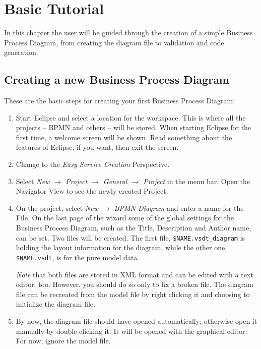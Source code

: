 \chapter{Basic Tutorial}
\label{sec:user_tut}

In this chapter the user will be guided through the creation of a simple Business Process Diagram, from creating the diagram file to validation and code generation.


\section{Creating a new Business Process Diagram}
\label{sec:user_tut_new}

These are the basic steps for creating your first Business Process Diagram:

\begin{enumerate}
	
	\item Start Eclipse and select a location for the workspace. This is where all the projects -- BPMN and others -- will be stored. When starting Eclipse for the first time, a welcome screen will be shown. Read something about the features of Eclipse, if you want, then exit the screen.
	
	\item Change to the \emph{Easy Service Creation} Perspective.
	
	\item Select \emph{ New $\rightarrow$ Project $\rightarrow$ General $\rightarrow$ Project } in the menu bar. Open the Navigator View to see the newly created Project.
	
	\item On the project, select \emph{New $\rightarrow$ BPMN Diagram} and enter a name for the File.  On the last page of the wizard some of the global settings for the Business Process Diagram, such as the Title, Description and Author name, can be set.  Two files will be created.  The first file, \verb|$NAME.vsdt_diagram| is holding the layout information for the diagram, while the other one, \verb|$NAME.vsdt|, is for the pure model data.
	
	\emph{Note} that both files are stored in XML format and can be edited with a text editor, too. However, you should do so only to fix a broken file. The diagram file can be recreated from the model file by right clicking it and choosing to initialize the diagram file.
	
	\item By now, the diagram file should have opened automatically; otherwise open it manually by double-clicking it. It will be opened with the graphical editor. For now, ignore the model file.

\end{enumerate}


